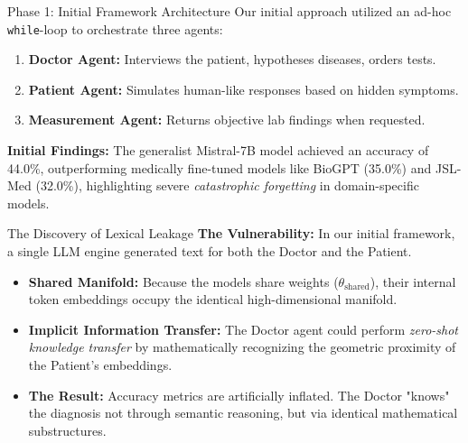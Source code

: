 \documentclass[10pt, aspectratio=169]{beamer}
\begin{document}
\begin{frame}{Phase 1: Initial Framework Architecture}
    Our initial approach utilized an ad-hoc \texttt{while}-loop to orchestrate three agents:
    \vspace{0.3cm}
    \begin{enumerate}
        \item \textbf{Doctor Agent:} Interviews the patient, hypotheses diseases, orders tests.
        \item \textbf{Patient Agent:} Simulates human-like responses based on hidden symptoms.
        \item \textbf{Measurement Agent:} Returns objective lab findings when requested.
    \end{enumerate}
    \vspace{0.3cm}
    \textbf{Initial Findings:} The generalist Mistral-7B model achieved an accuracy of 44.0\%, outperforming medically fine-tuned models like BioGPT (35.0\%) and JSL-Med (32.0\%), highlighting severe \textit{catastrophic forgetting} in domain-specific models.
\end{frame}

\begin{frame}{The Discovery of Lexical Leakage}
    \textbf{The Vulnerability:} In our initial framework, a single LLM engine generated text for both the Doctor and the Patient.
    \vspace{0.3cm}
    \begin{itemize}
        \item \textbf{Shared Manifold:} Because the models share weights ($\theta_{\text{shared}}$), their internal token embeddings occupy the identical high-dimensional manifold.
        \item \textbf{Implicit Information Transfer:} The Doctor agent could perform \textit{zero-shot knowledge transfer} by mathematically recognizing the geometric proximity of the Patient's embeddings.
        \item \textbf{The Result:} Accuracy metrics are artificially inflated. The Doctor "knows" the diagnosis not through semantic reasoning, but via identical mathematical substructures.
    \end{itemize}
\end{frame}
\end{document}
